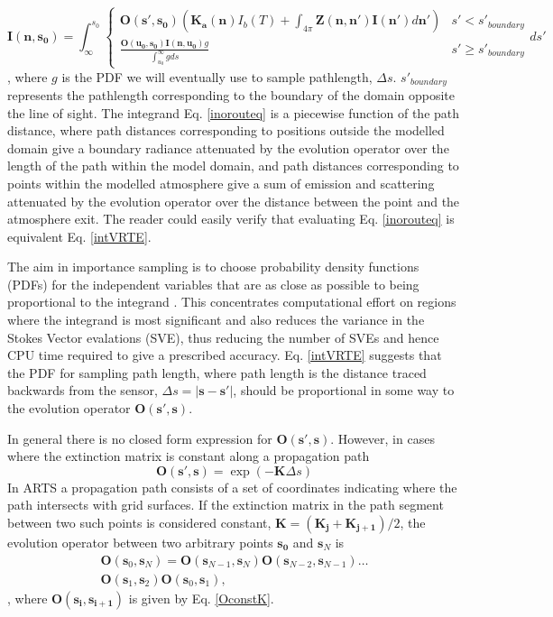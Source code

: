 \begin{equation}
\mathbf{I(n,s_0)}=\int^{s_0}_\infty\left\{\begin{array}{rl}
\mathbf{O(s',s_0)}\left(\mathbf{K_a(n)}I_b(T)
+\int_{4\pi}\mathbf{Z(n,n')}\mathbf{I(n')}d\mathbf{n'}\right) & s'< s'_{boundary} \\
\frac{\mathbf{O(u_0,s_0)I(n,u_0)}g}{\int^\infty_{u_0}gds} & s'\ge s'_{boundary}
\end{array}ds'\right.
\label{inorouteq}
\end{equation}
, where $g$ is the PDF we will eventually use to sample pathlength,
$\Delta s$. $s'_{boundary}$ represents the pathlength corresponding to
the boundary of the domain opposite the line of sight.
The integrand Eq. \ref{inorouteq} is a piecewise function of the
path distance, where path distances corresponding to positions outside
the modelled domain give a boundary radiance attenuated by the evolution
operator over the length of the path within the model domain, and path
distances corresponding to points within the modelled atmosphere give
a sum of emission and scattering attenuated by the evolution operator
over the distance between the point and the atmosphere exit. 
The reader
could easily verify that evaluating Eq. \ref{inorouteq} is equivalent
Eq. \ref{intVRTE}. 

The aim in importance sampling is to choose probability density functions
(PDFs) for the independent variables that are
as close as possible to being proportional to the integrand
\cite{liu:01}. This concentrates computational effort on regions where
the integrand is most significant and also reduces the variance in the Stokes Vector evalations (SVE), thus reducing
the number of SVEs and hence CPU time required to give a
prescribed accuracy.  Eq. \ref{intVRTE} suggests that the PDF for
sampling path length, where path length is the distance traced backwards
from the sensor, $\Delta s=\left|\mathbf{s}-\mathbf{s'}\right|$, should be proportional in some way to the evolution
operator $\mathbf{O(s',s)}$. 

In general there is no closed form expression for $\mathbf{O(s',s)}$.
However, in cases where the extinction matrix is constant along a
propagation path
\begin{equation}
\mathbf{O(s',s)}=\exp\left(-\mathbf{K}\Delta s\right)
\label{OconstK}
\end{equation}
In ARTS a propagation path consists of a set of coordinates
indicating where the path intersects with grid surfaces.  If the
extinction matrix in the path segment between two such points is
considered constant, $\mathbf{K}=(\mathbf{K_j}+\mathbf{K_{j+1}})/2$,
the evolution operator between two arbitrary points $\mathbf{s_0}$ and
$\mathbf{s}_N$ is
\begin{eqnarray}
\mathbf{O}(\mathbf{s}_0,\mathbf{s}_N) =
\mathbf{O}(\mathbf{s}_{N-1},\mathbf{s}_N)
\mathbf{O}(\mathbf{s}_{N-2},\mathbf{s}_{N-1}) \dots \nonumber\\
\mathbf{O}(\mathbf{s}_1,\mathbf{s}_2)\mathbf{O}(\mathbf{s}_0,\mathbf{s}_1),
\label{Ogeneral}
\end{eqnarray}
, where $\mathbf{O(s_i,s_{i+1})}$ is given by Eq. \ref{OconstK}.


